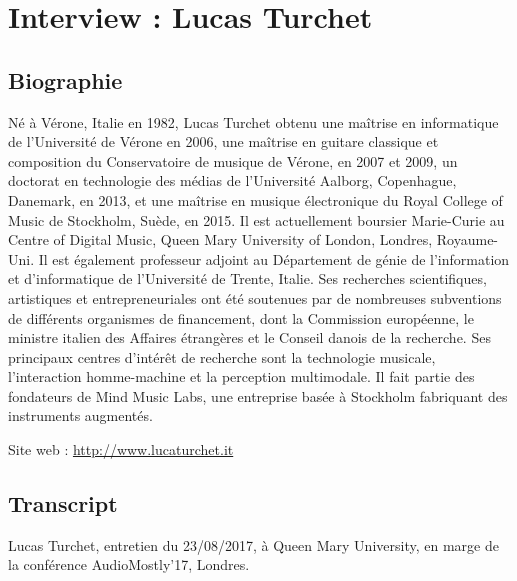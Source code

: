 \chapter{Interview : Lucas Turchet}
\label{appendix:turchet}

\section*{Biographie}
\noindent Né à Vérone, Italie en 1982, Lucas Turchet obtenu une maîtrise en informatique de l'Université de Vérone en 2006, une maîtrise en guitare classique et composition du Conservatoire de musique de Vérone, en 2007 et 2009, un doctorat en technologie des médias de l'Université Aalborg, Copenhague, Danemark, en 2013, et une maîtrise en musique électronique du Royal College of Music de Stockholm, Suède, en 2015. Il est actuellement boursier Marie-Curie au Centre of Digital Music, Queen Mary University of London, Londres, Royaume-Uni. Il est également professeur adjoint au Département de génie de l'information et d'informatique de l'Université de Trente, Italie. Ses recherches scientifiques, artistiques et entrepreneuriales ont été soutenues par de nombreuses subventions de différents organismes de financement, dont la Commission européenne, le ministre italien des Affaires étrangères et le Conseil danois de la recherche. Ses principaux centres d'intérêt de recherche sont la technologie musicale, l'interaction homme-machine et la perception multimodale. Il fait partie des fondateurs de Mind Music Labs, une entreprise basée à Stockholm fabriquant des instruments augmentés.

\noindent Site web : \url{http://www.lucaturchet.it}

\section*{Transcript}

\noindent Lucas Turchet, entretien du 23/08/2017, à Queen Mary University, en marge de la conférence AudioMostly'17, Londres.



